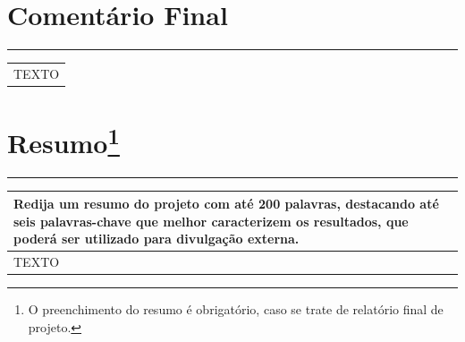 \documentclass[a4paper,12pt]{article}
\begin{document}
\section{Comentário Final}
\vspace{-0.8cm} %
\rule{\textwidth}{2pt} %
\vspace{-0.9cm} %
\begin{table}[h]
    \begin{longtable}{|p{17.4cm}|} %
     \hline
     \rowcolor{lightgray} 
     \fontsize{8}{10}\selectfont{Acrescente observações relevantes, que não se aplicariam aos outros campos do relatório.}  
     \\ \hline \endhead
     
     \fontsize{10}{12}\selectfont 
     
     
     TEXTO
     
     
     
     \\ \hline
     \end{longtable}
     \end{table}
\newpage
\section
[\texorpdfstring{Resumo}{Resumo}]
{Resumo\protect\footnote{O preenchimento do resumo é obrigatório, caso se trate de relatório final de projeto.}}
\vspace{-0.8cm} %
\rule{\textwidth}{2pt} %
\vspace{-0.9cm} %
\begin{table}[h]

    \begin{longtable}{|p{17.4cm}|} %
     \hline
     \rowcolor{lightgray} 
     \fontsize{8}{10}\selectfont \textbf{Redija um resumo do projeto com até 200 palavras, destacando até seis palavras-chave que melhor caracterizem os resultados, que poderá ser utilizado para divulgação externa.}  
     \\ \hline \endfirsthead %
     
     \fontsize{10}{12}\selectfont 
     
     TEXTO
     
     \\ \hline
     \end{longtable}

\end{table}
\newpage
\end{document}
